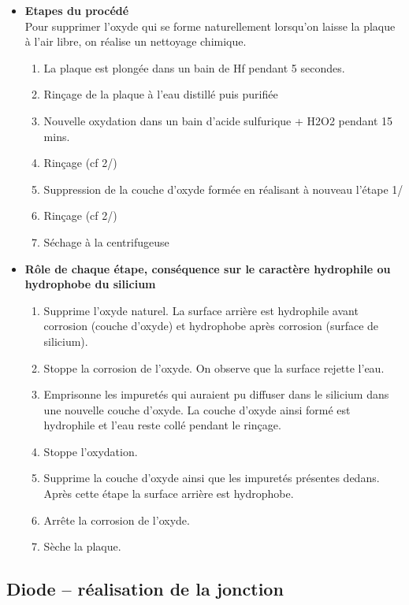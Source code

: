 \documentclass[11pt]{article}
\begin{document}
\begin{itemize}

\item \textbf{Etapes du proc\'ed\'e} \\ 
Pour supprimer l'oxyde qui se forme naturellement lorsqu'on laisse la plaque \`a l'air libre, on r\'ealise un nettoyage chimique.
\begin{enumerate}\itemsep -2pt
\item La plaque est plong\'ee dans un bain de Hf pendant 5 secondes.
\item Rin\c cage de la plaque \`a l'eau distill\'e puis purifi\'ee
\item Nouvelle oxydation dans un bain d'acide sulfurique + H2O2 pendant 15 mins. 
\item Rin\c cage (cf 2/)
\item Suppression de la couche d'oxyde form\'ee en r\'ealisant \`a nouveau l'\'etape 1/
\item Rin\c cage (cf 2/)
\item S\'echage \`a la centrifugeuse
\end{enumerate}

\item \textbf{R\^ole de chaque \'etape, cons\'equence sur le caract\`ere hydrophile ou hydrophobe du silicium}

\begin{enumerate}\itemsep -2pt
\item Supprime l'oxyde naturel. La surface arri\`ere est hydrophile avant corrosion (couche d'oxyde) et hydrophobe apr\`es corrosion (surface de silicium).
\item Stoppe la corrosion de l'oxyde. On observe que la surface rejette l'eau.
\item  Emprisonne les impuret\'es qui auraient pu diffuser dans le silicium dans une nouvelle couche d'oxyde. La couche d'oxyde ainsi form\'e est hydrophile et l'eau reste coll\'e pendant le rin\c cage.
\item Stoppe l'oxydation.
\item Supprime la couche d'oxyde ainsi que les impuret\'es pr\'esentes dedans. Apr\`es cette \'etape la surface arri\`ere est hydrophobe.
\item Arr\^ete la corrosion de l'oxyde. 
\item S\`eche la plaque.
\end{enumerate}

\end{itemize}

\subsection{Diode -- r\'ealisation de la jonction}
\end{document}

